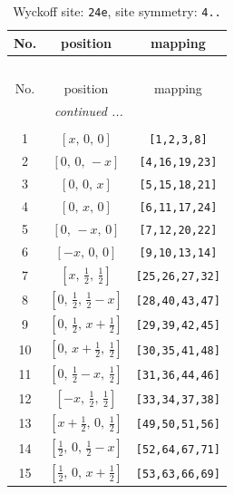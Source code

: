 \documentclass[fleqn,8pt]{jsarticle}
\begin{document}
\begin{longtable}{ccc}
\caption{Wyckoff site: {\tt 24e}, site symmetry: {\tt 4..}}
 \\
 \hline \hline
No. & position & mapping \\ \hline \endfirsthead

\multicolumn{2}{l}{\tablename\ \thetable{}} \\
 \hline \hline
No. & position & mapping \\ \hline \endhead

 \hline \hline
\multicolumn{2}{r}{\footnotesize\it continued ...} \\ \endfoot

 \hline \hline
\multicolumn{2}{r}{} \\ \endlastfoot

1 & $\left[ x,\, 0,\, 0 \right]$ & {\tt [1,2,3,8]} \\ \hline
2 & $\left[ 0,\, 0,\, - x \right]$ & {\tt [4,16,19,23]} \\ \hline
3 & $\left[ 0,\, 0,\, x \right]$ & {\tt [5,15,18,21]} \\ \hline
4 & $\left[ 0,\, x,\, 0 \right]$ & {\tt [6,11,17,24]} \\ \hline
5 & $\left[ 0,\, - x,\, 0 \right]$ & {\tt [7,12,20,22]} \\ \hline
6 & $\left[ - x,\, 0,\, 0 \right]$ & {\tt [9,10,13,14]} \\ \hline
7 & $\left[ x,\, \frac{1}{2},\, \frac{1}{2} \right]$ & {\tt [25,26,27,32]} \\ \hline
8 & $\left[ 0,\, \frac{1}{2},\, \frac{1}{2} - x \right]$ & {\tt [28,40,43,47]} \\ \hline
9 & $\left[ 0,\, \frac{1}{2},\, x + \frac{1}{2} \right]$ & {\tt [29,39,42,45]} \\ \hline
10 & $\left[ 0,\, x + \frac{1}{2},\, \frac{1}{2} \right]$ & {\tt [30,35,41,48]} \\ \hline
11 & $\left[ 0,\, \frac{1}{2} - x,\, \frac{1}{2} \right]$ & {\tt [31,36,44,46]} \\ \hline
12 & $\left[ - x,\, \frac{1}{2},\, \frac{1}{2} \right]$ & {\tt [33,34,37,38]} \\ \hline
13 & $\left[ x + \frac{1}{2},\, 0,\, \frac{1}{2} \right]$ & {\tt [49,50,51,56]} \\ \hline
14 & $\left[ \frac{1}{2},\, 0,\, \frac{1}{2} - x \right]$ & {\tt [52,64,67,71]} \\ \hline
15 & $\left[ \frac{1}{2},\, 0,\, x + \frac{1}{2} \right]$ & {\tt [53,63,66,69]} \\ \hline

\end{longtable}
\end{document}
